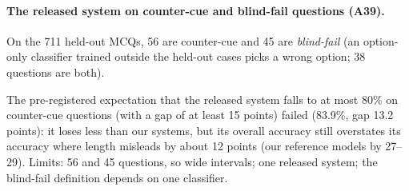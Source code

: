 \paragraph{The released system on counter-cue and blind-fail questions (A39).}
On the 711 held-out MCQs, 56 are counter-cue and 45 are \emph{blind-fail} (an option-only classifier trained outside the held-out cases picks a wrong option; 38 questions are both).
\begin{center}
\footnotesize
\setlength{\tabcolsep}{3pt}
\end{center}
The pre-registered expectation that the released system falls to at most 80\% on counter-cue questions (with a gap of at least 15 points) failed (83.9\%, gap 13.2 points): it loses less than our systems, but its overall accuracy still overstates its accuracy where length misleads by about 12 points (our reference models by 27--29).
Limits: 56 and 45 questions, so wide intervals; one released system; the blind-fail definition depends on one classifier.

